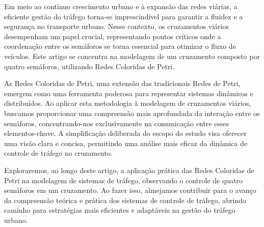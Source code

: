 Em meio ao contínuo crescimento urbano e à expansão das redes viárias, a eficiente gestão do tráfego torna-se imprescindível para garantir a fluidez e a segurança no transporte urbano.
Nesse contexto, os cruzamentos viários desempenham um papel crucial, representando pontos críticos onde a coordenação entre os semáforos se torna essencial para otimizar o fluxo de veículos.
Este artigo se concentra na modelagem de um cruzamento composto por quatro semáforos, utilizando Redes Coloridas de Petri.

As Redes Coloridas de Petri, uma extensão das tradicionais Redes de Petri, emergem como uma ferramenta poderosa para representar sistemas dinâmicos e distribuídos.
Ao aplicar esta metodologia à modelagem de cruzamentos viários, buscamos proporcionar uma compreensão mais aprofundada da interação entre os semáforos, concentrando-nos exclusivamente na comunicação entre esses elementos-chave.
A simplificação deliberada do escopo do estudo visa oferecer uma visão clara e concisa, permitindo uma análise mais eficaz da dinâmica de controle de tráfego no cruzamento.

Exploraremos, ao longo deste artigo, a aplicação prática das Redes Coloridas de Petri na modelagem de sistemas de tráfego, observando o controle de quatro semáforos em um cruzamento.
Ao fazer isso, almejamos contribuir para o avanço da compreensão teórica e prática dos sistemas de controle de tráfego, abrindo caminho para estratégias mais eficientes e adaptáveis na gestão do tráfego urbano.